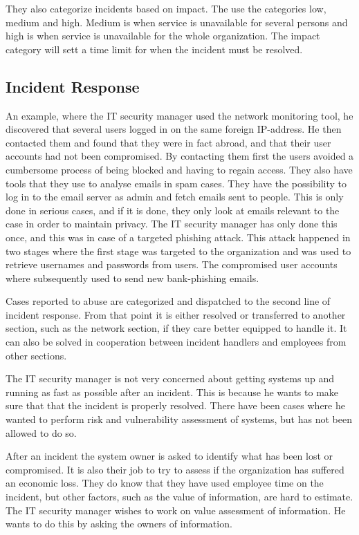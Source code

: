 They also categorize incidents based on impact. The use the categories low, medium and high. Medium is when service is unavailable for several persons and high is when service is unavailable for the whole organization. The impact category will sett a time limit for when the incident must be resolved.

\subsection{Incident Response}
An example, where the IT security manager used the network monitoring tool, he discovered that several users logged in on the same foreign IP-address. He then contacted them and found that they were in fact abroad, and that their user accounts had not been compromised. By contacting them first the users avoided a cumbersome process of being blocked and having to regain access. They also have tools that they use to analyse emails in spam cases. They have the possibility to log in to the email server as admin and fetch emails sent to people. This is only done in serious cases, and if it is done, they only look at emails relevant to the case in order to maintain privacy. The IT security manager has only done this once, and this was in case of a targeted phishing attack. This attack happened in two stages where the first stage was targeted to the organization and was used to retrieve usernames and passwords from users. The compromised user accounts where subsequently used to send new bank-phishing emails.

Cases reported to abuse are categorized and dispatched to the second line of incident response. %
From that point it is either resolved or transferred to another section, such as the network section, if they care better equipped to handle it. It can also be solved in cooperation between incident handlers and employees from other sections.

The IT security manager is not very concerned about getting systems up and running as fast as possible after an incident. This is because he wants to make sure that that the incident is properly resolved. There have been cases where he wanted to perform risk and vulnerability assessment of systems, but has not been allowed to do so.

After an incident the system owner is asked to identify what has been lost or compromised. It is also their job to try to assess if the organization has suffered an economic loss. They do know that they have used employee time on the incident, but other factors, such as the value of information, are hard to estimate. The IT security manager wishes to work on value assessment of information. He wants to do this by asking the owners of information.

